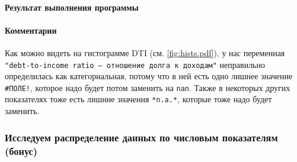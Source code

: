 \documentclass[12pt,a4paper]{article}
\begin{document}
\begin{Shaded}
\begin{Highlighting}[]
\NormalTok{)}
\end{Highlighting}
\end{Shaded}

  \paragraph*{Результат выполнения программы}

  \paragraph*{Комментарии}
  \label{sec:pole}
  Как можно видеть на гистограмме DTI (см. \autoref{fig:hists.pdf}), у нас переменная
  \texttt{"debt-to-income ratio — отношение долга к доходам"}
  неправильно определилась как категориальная, потому что в ней есть одно
  лишнее значение \texttt{\#ПОЛЕ!}, которое надо будет потом заменить на
  \texttt{nan}. Также в некоторых других показателях тоже есть лишние
  значения \texttt{*n.a.*}, которые тоже надо будет заменить.

  \subsubsection{Исследуем распределение данных по числовым показателям (бонус)}
\end{document}
